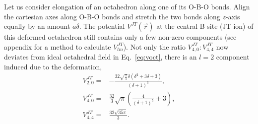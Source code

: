 \documentclass[a4paper,prb,twocolumn]{revtex4-1}  %
\newcommand{\com}[1]{}
\newcommand{\ylm}[1]{Y_{#1}(\hat r)}
\begin{document}
Let us consider elongation of an octahedron %
along one of its O-B-O bonds. 
Align the cartesian axes along O-B-O bonds and stretch the two bonds along $z$-axis equally by an amount $a\delta$.
The potential $V^{JT}(\vec r)$ at the central B site (JT ion) of this deformed octahedron 
still contains only a few non-zero components (see appendix for a method to calculate $V_{lm}^{JT}$).
Not only the ratio 
$V_{4,0}^{JT}:V_{4,4}^{JT}$ now deviates from
 ideal 
octahedral field in Eq.~\ref{eq:voct},
there is an $l=2$ component induced due to the deformation,
\begin{align}
V_{2,0}^{JT}=& -\frac{32 \sqrt{\frac{\pi }{5}} \delta  \left(\delta ^2+3 \delta +3\right)}{(\delta +1)^3},\\
V_{4,0}^{JT}=& \frac{32}{3} \sqrt{\pi } \left(\frac{4}{(\delta +1)^5}+3\right),\\
V_{4,4}^{JT}=& \frac{32 \sqrt{35 \pi }}{3}.
\end{align}

\com{
At $\delta=0$, keeping only the non-spherical components, 
we obtain the
 octahedral potential for a symmetric octahedron~\cite{PavariniChap},
\begin{align}
\label{eq:voct}
\lim_{\delta\to0}V^{JT}(\vec r) \to V_{oct}(\vec r) = -\frac{224\sqrt{\pi}}{3}\frac{q_o}{a} \left(\frac{r}{a}\right)^4\left[\ylm{4,0}+\sqrt{\frac{5}{7}}\ylm{4,4} \right],
\end{align}
}
\end{document}
